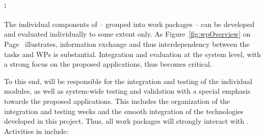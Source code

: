 \paragraph{\textbf{\WPIntegration: \WPIntegrationTitle}}

The individual components of \Project{} -- grouped into work packages -- can be developed and evaluated individually to some extent only.  As Figure~\ref{fig:wpOverview} on Page~\pageref{fig:wpOverview} illustrates, information exchange and thus interdependency between the tasks and WPs is substantial. Integration and evaluation at the system level, with a strong focus on the proposed applications, thus becomes critical.

To this end, \WPIntegration will be responsible for the integration and testing of the individual modules, as well as system-wide testing and validation with a special emphasis towards the proposed applications. This includes the organization of the integration and testing weeks and the smooth integration of the technologies developed in this project. Thus, all work packages will strongly interact with \WPIntegration. Activities in \WPIntegration include:
